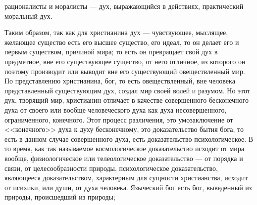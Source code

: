 \documentclass[12pt]{article}
\begin{document}
рационалисты и моралисты --- дух, выражающийся в действиях, практический моральный дух. 

Таким образом, так как для христианина дух --- чувствующее, мыслящее, желающее существо есть его высшее существо, его идеал, то он делает его и первым существом, причиной мира; то есть он превращает свой дух в предметное, вне его существующее существо, от него отличное, из которого он поэтому производит или выводит вне его существующий овеществленный мир. По представлению христианина, бог, то есть овеществленный, вне человека представленный существующим дух, создал мир своей волей и разумом. Но этот дух, творящий мир, христианин отличает в качестве совершенного бесконечного духа от своего или вообще человеческого духа как духа несовершенного, ограниченного, конечного. Этот процесс различения, это умозаключение от <<конечного>> духа к духу бесконечному, это доказательство бытия бога, то есть в данном случае совершенного духа, есть доказательство психологическое. В то время, как так называемое космологическое доказательство исходит от мира вообще, физиологическое или телеологическое доказательство --- от порядка и связи, от целесообразности природы, психологическое доказательство, являющееся доказательством, характерным для сущности христианства, исходит от психики, или души, от духа человека. Языческий бог есть бог, выведенный из природы, происшедший из природы; 
\end{document}
